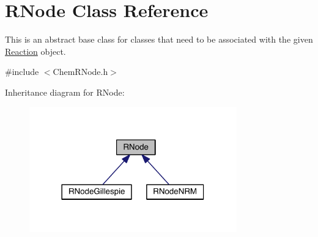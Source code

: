 \hypertarget{classRNode}{\section{R\+Node Class Reference}
\label{classRNode}
}


This is an abstract base class for classes that need to be associated with the given \hyperlink{classReaction}{Reaction} object.  




{\ttfamily \#include $<$Chem\+R\+Node.\+h$>$}



Inheritance diagram for R\+Node\+:\nopagebreak
\begin{figure}[H]
\begin{center}
\leavevmode
\includegraphics[width=254pt]{classRNode__inherit__graph}
\end{center}
\end{figure}
